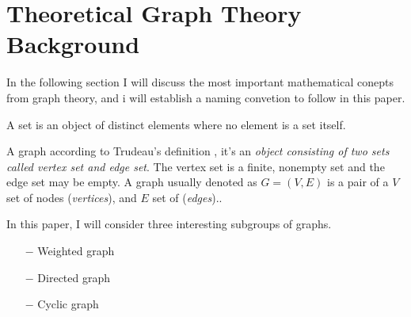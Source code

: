 \section{Theoretical Graph Theory Background}\label{sec:theoreticalBackground}
In the following section I will discuss the most important mathematical conepts from graph theory, and i will establish a naming convetion to follow in this paper. 
\begin{definition}
	A set is an object of distinct elements where no element is a set itself. 
\end{definition}
\begin{definition}
A graph according to Trudeau's definition \cite{1}, it's an \textit{object consisting of two sets called vertex set and edge set}. The vertex set is a finite, nonempty set and the edge set may be empty. A graph usually denoted as $ G = (V, E)$ is a pair of a $V$ set of nodes (\textit{vertices}), and $E$ set of (\textit{edges}).\cite{2}. 
 \end{definition}
In this paper, I will consider three interesting subgroups of graphs.
 \begin{itemize}
 \item[$-$] Weighted graph
 \item[$-$] Directed graph
 \item[$-$] Cyclic graph
 \end{itemize}

